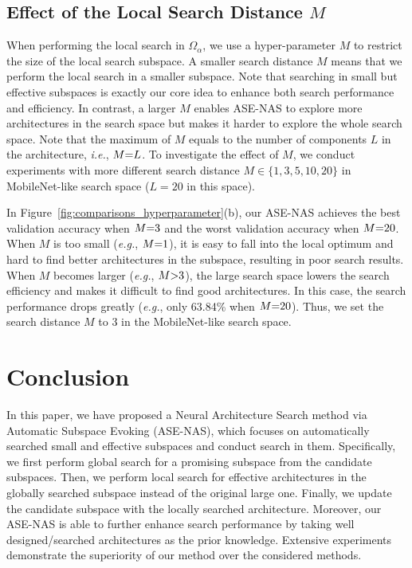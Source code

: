 \documentclass[lettersize,journal]{IEEEtran}
\newcommand{\sexyname}{ASE-NAS\xspace}
\def\eg{\emph{e.g.}} \def\Eg{\emph{E.g.}}
\def\ie{\emph{i.e.}} \def\Ie{\emph{I.e.}}
\begin{document}
\subsection{Effect of the Local Search Distance $M$}\label{sec:ablation_on_M}

When performing the local search in $\Omega_\alpha$, we use a hyper-parameter $M$ to restrict the size of the local search subspace.
A smaller search distance $M$ means that we perform the local search in a smaller subspace.
Note that searching in small but effective subspaces is exactly our core idea to enhance both search performance and efficiency.
In contrast, a larger $M$ enables \sexyname to explore more architectures in the search space but makes it harder to explore the whole search space.
Note that the maximum of $M$ equals to the number of components $L$ in the architecture, \ie, $M\small{=}L$.
To investigate the effect of $M$, we conduct experiments with more different search distance $M \in \{1,3,5,10,20\}$ in MobileNet-like search space ($L=20$ in this space). 


In Figure~\ref{fig:comparisons_hyperparameter}(b), our \sexyname achieves the best validation accuracy when $M\small{=}3$ and the worst validation accuracy when $M\small{=}20$. When $M$ is too small (\eg, $M\small{=}1$), it is easy to fall into the local optimum and hard to find better architectures in the subspace, resulting in poor search results.
When $M$ becomes larger (\eg, $M\small{>}3$), the large search space lowers the search efficiency and makes it difficult to find good architectures.
In this case, the search performance drops greatly (\eg, only 63.84\% when $M\small{=}20$).
Thus, we set the search distance $M$ to 3 in the MobileNet-like search space.


\section{Conclusion}

In this paper, we have proposed a Neural Architecture Search method via Automatic Subspace Evoking (\sexyname), which focuses on automatically searched small and effective subspaces and conduct search in them.
Specifically, we first perform global search for a promising subspace from the candidate subspaces.
Then, we perform local search for effective architectures in the globally searched subspace instead of the original large one.
Finally, we update the candidate subspace with the locally searched architecture.
Moreover, our \sexyname is able to further enhance search performance by taking well designed/searched architectures as the prior knowledge.
Extensive experiments demonstrate the superiority of our method over the considered methods.
\end{document}
